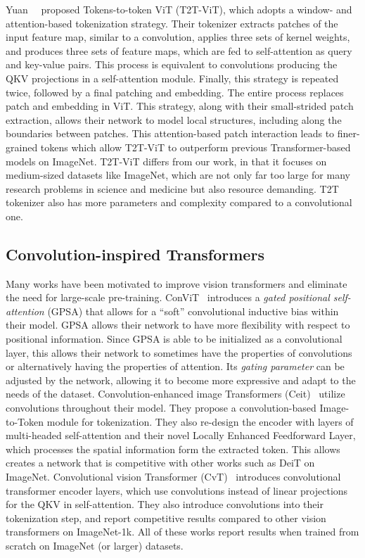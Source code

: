 \documentclass[10pt,twocolumn,letterpaper]{article}
\begin{document}
Yuan~\etal~\cite{yuan2021tokens} proposed Tokens-to-token ViT (T2T-ViT), which adopts a window- and attention-based tokenization strategy. Their tokenizer extracts patches of the input feature map, similar to a convolution, applies three sets of kernel weights, and produces three sets of feature maps, which are fed to self-attention as query and key-value pairs. This process is equivalent to convolutions producing the QKV projections in a self-attention module. Finally, this strategy is repeated twice, followed by a final patching and embedding. The entire process replaces patch and embedding in ViT.
This strategy, along with their small-strided patch extraction, allows their network to model local structures, including along the boundaries between patches.
This attention-based patch interaction leads to finer-grained tokens which allow T2T-ViT to outperform previous Transformer-based models on ImageNet.
T2T-ViT differs from our work, in that it focuses on medium-sized datasets like ImageNet, which are not only far too large for many research problems in science and medicine but also resource demanding. T2T tokenizer also has more parameters and complexity compared to a convolutional one.

\subsection{Convolution-inspired Transformers}
Many works have been motivated to improve vision transformers and eliminate the need for large-scale pre-training. ConViT~\cite{d2021convit} introduces a \textit{gated positional self-attention} (GPSA) that allows for a ``soft'' convolutional inductive bias within their model.
GPSA allows their network to have more flexibility with respect to positional information.
Since GPSA is able to be initialized as a convolutional layer, this allows their network to sometimes have the properties of convolutions or alternatively having the properties of attention.
Its \textit{gating parameter} can be adjusted by the network, allowing it to become more expressive and adapt to the needs of the dataset.
Convolution-enhanced image Transformers (Ceit)~\cite{yuan2021incorporating} utilize convolutions throughout their model.
They propose a convolution-based Image-to-Token module for tokenization. They also re-design the encoder with layers of multi-headed self-attention and their novel Locally Enhanced Feedforward Layer, which processes the spatial information form the extracted token.
This allows creates a network that is competitive with other works such as DeiT on ImageNet.
Convolutional vision Transformer (CvT)~\cite{wu2021cvt} introduces convolutional transformer encoder layers, which use convolutions instead of linear projections for the QKV in self-attention. They also introduce convolutions into their tokenization step, and report competitive results compared to other vision transformers on ImageNet-1k.
All of these works report results when trained from scratch on ImageNet (or larger) datasets.
\end{document}
